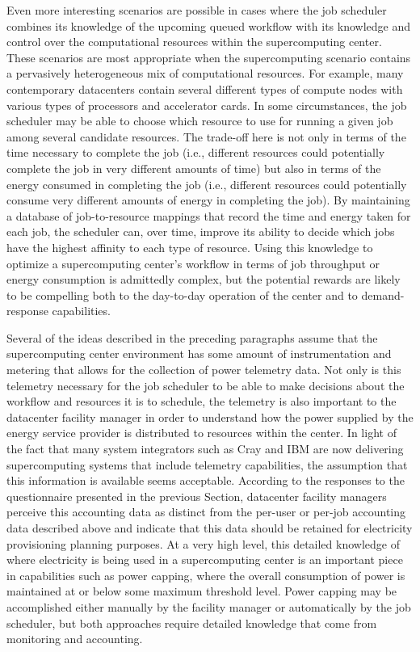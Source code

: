 Even more interesting scenarios are possible in cases where the job
scheduler combines its knowledge of the upcoming queued workflow with
its knowledge and control over the computational resources within
the supercomputing center.  These scenarios are most appropriate when
the supercomputing scenario contains a pervasively heterogeneous mix
of computational resources.  For example, many contemporary datacenters
contain several different types of compute nodes with various types of
processors and accelerator cards.  In some circumstances, the job
scheduler may be able to choose which resource to use for running a
given job among several candidate resources.  The trade-off here is
not only in terms of the time necessary to complete the job (i.e.,
different resources could potentially complete the job in very different
amounts of time) but also in terms of the energy consumed in completing
the job (i.e., different resources could potentially consume very
different amounts of energy in completing the job).  By maintaining a
database of job-to-resource mappings that record the time and energy
taken for each job, the scheduler can, over time, improve its ability
to decide which jobs have the highest affinity to each type of resource.
Using this knowledge to optimize a supercomputing center's workflow in
terms of job throughput or energy consumption is admittedly complex,
but the potential rewards are likely to be compelling both to the
day-to-day operation of the center and to demand-response capabilities.

Several of the ideas described in the preceding paragraphs assume
that the supercomputing center environment has some amount of
instrumentation and metering that allows for the collection of power
telemetry data.  Not only is this telemetry necessary for the job
scheduler to be able to make decisions about the workflow and
resources it is to schedule, the telemetry is also important to the
datacenter facility manager in order to understand how the power
supplied by the energy service provider is distributed to resources
within the center.  In light of the fact that many system integrators
such as Cray and IBM are now delivering supercomputing systems that
include telemetry capabilities, the assumption that this information
is available seems acceptable.  According to the responses to the
questionnaire presented in the previous Section, datacenter facility
managers perceive this accounting data as distinct from the per-user
or per-job accounting data described above and indicate that this
data should be retained for electricity provisioning planning purposes.
At a very high level, this detailed knowledge of where electricity is
being used in a supercomputing center is an important piece in
capabilities such as power capping, where the overall consumption of
power is maintained at or below some maximum threshold level.  Power
capping may be accomplished either manually by the facility manager
or automatically by the job scheduler, but both approaches require
detailed knowledge that come from monitoring and accounting.

